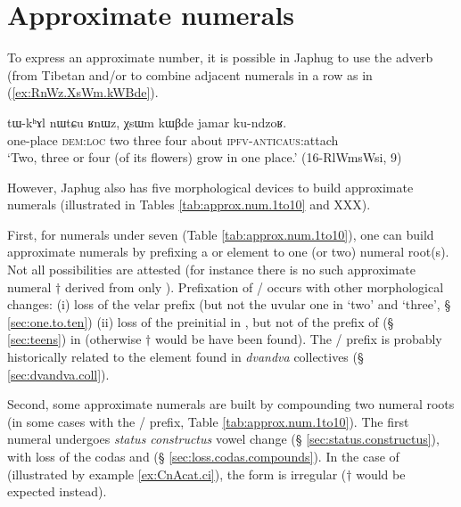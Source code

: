 \section{Approximate numerals} \label{sec:approx.numerals}
To express an approximate number, it is possible in Japhug to use the adverb  (from Tibetan  and/or to combine adjacent numerals in a row as in (\ref{ex:RnWz.XsWm.kWBde}).

\begin{exe}
\ex \label{ex:RnWz.XsWm.kWBde}
\gll tɯ-kʰɤl nɯtɕu ʁnɯz, χsɯm kɯβde jamar ku-ndzoʁ. \\
one-place \textsc{dem}:\textsc{loc} two three four about \textsc{ipfv}-\textsc{anticaus}:attach \\
\glt `Two, three or four (of its flowers) grow in one place.' (16-RlWmsWsi, 9)
\end{exe}

However, Japhug also has five morphological devices to build approximate numerals (illustrated in Tables \ref{tab:approx.num.1to10} and XXX).

First, for numerals under seven (Table \ref{tab:approx.num.1to10}), one can build approximate numerals by prefixing a  or  element to one (or two) numeral root(s). Not all possibilities are attested (for instance there is no such approximate numeral $\dagger$ derived from only ).  Prefixation of  /  occurs with other morphological changes: (i) loss of the velar  prefix (but not the uvular one in `two' and `three', § \ref{sec:one.to.ten}) (ii) loss of the  preinitial in  , but not of the  prefix of  (§ \ref{sec:teens}) in  (otherwise $\dagger$ would be have been found). The  /  prefix is probably historically related to the  element found in \textit{dvandva} collectives (§ \ref{sec:dvandva.coll}).

Second, some approximate numerals are built by compounding two numeral roots (in some cases with the   /  prefix, Table \ref{tab:approx.num.1to10}). The first numeral undergoes \textit{status constructus} vowel change (§ \ref{sec:status.constructus}), with loss of the codas  and  (§ \ref{sec:loss.codas.compounds}). In the case of  (illustrated by example \ref{ex:CnAcat.ci}), the form  is irregular ($\dagger$ would be expected instead).

